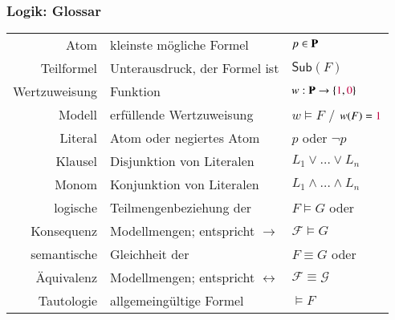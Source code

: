 \documentclass[aspectratio=1610,onlymath]{beamer}
\begin{document}
\maketitle


\begin{frame}\frametitle{Logik: Glossar}

\begin{tabular}{@{}rll@{}}
\rowcolor{darkblue!10}
Atom & kleinste mögliche Formel & $p\in\textbf{\textcolor{black}{P}}$\\
%
Teilformel & Unterausdruck, der Formel ist & $\textsf{Sub}(F)$ \\
%
\rowcolor{darkblue!10}
Wertzuweisung & Funktion & $w:\textbf{\textcolor{black}{P}}\to\{\textcolor{purple}{1},\textcolor{purple}{0}\}$\\
%
Modell & erfüllende Wertzuweisung & $w\models F$ / $w(F)=\textcolor{purple}{1}$\\
%
\rowcolor{darkblue!10}
Literal & Atom oder negiertes Atom & $p$ oder $\neg p$\\
%
Klausel & Disjunktion von Literalen & $L_1\vee\ldots\vee L_n$ \\
%
\rowcolor{darkblue!10}
Monom & Konjunktion von Literalen & $L_1\wedge\ldots\wedge L_n$ \\
%
logische & Teilmengenbeziehung der  & $F\models G$ oder \\[-0.8ex]
Konsequenz & Modellmengen; entspricht $\to$ &  $\mathcal{F}\models G$\\
%
\rowcolor{darkblue!10}
semantische & Gleichheit der  & $F\equiv G$ oder \\[-0.8ex]
\rowcolor{darkblue!10}
Äquivalenz & Modellmengen; entspricht $\leftrightarrow$ &  $\mathcal{F}\equiv\mathcal{G}$\\
%
Tautologie & allgemeingültige Formel & $\models F$

\end{tabular}

\end{frame}
\end{document}
